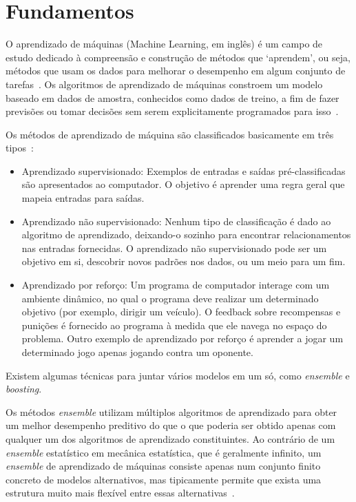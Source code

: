 \chapter{Fundamentos}
\label{ch:fundamentos}

O aprendizado de máquinas (Machine Learning, em inglês) é um campo de estudo dedicado à compreensão e construção de métodos que `aprendem', ou seja, métodos que usam os dados para melhorar o desempenho em algum conjunto de tarefas~\cite{mitcheltom}.
Os algoritmos de aprendizado de máquinas constroem um modelo baseado em dados de amostra, conhecidos como dados de treino, a fim de fazer previsões ou tomar decisões sem serem explicitamente programados para isso~\cite{simonphill}.

Os métodos de aprendizado de máquina são classificados basicamente em três tipos~\cite{russellstuart}:

\begin{itemize}
    \item Aprendizado supervisionado:
    \subitem Exemplos de entradas e saídas pré-classificadas são apresentados ao computador.
    O objetivo é aprender uma regra geral que mapeia entradas para saídas.

    \item Aprendizado não supervisionado:
    \subitem Nenhum tipo de classificação é dado ao algoritmo de aprendizado, deixando-o sozinho para encontrar relacionamentos nas entradas fornecidas.
    O aprendizado não supervisionado pode ser um objetivo em si, descobrir novos padrões nos dados, ou um meio para um fim.

    \item Aprendizado por reforço:
    \subitem Um programa de computador interage com um ambiente dinâmico, no qual o programa deve realizar um determinado objetivo (por exemplo, dirigir um veículo).
    O feedback sobre recompensas e punições é fornecido ao programa à medida que ele navega no espaço do problema.
    Outro exemplo de aprendizado por reforço é aprender a jogar um determinado jogo apenas jogando contra um oponente.
\end{itemize}

Existem algumas técnicas para juntar vários modelos em um só, como \textit{ensemble} e \textit{boosting}.

Os métodos \textit{ensemble} utilizam múltiplos algoritmos de aprendizado para obter um melhor desempenho preditivo do que o que poderia ser obtido apenas com qualquer um dos algoritmos de aprendizado constituintes.
Ao contrário de um \textit{ensemble} estatístico em mecânica estatística, que é geralmente infinito, um \textit{ensemble} de aprendizado de máquinas consiste apenas num conjunto finito concreto de modelos alternativos, mas tipicamente permite que exista uma estrutura muito mais flexível entre essas alternativas~\cite{ensemble}.


